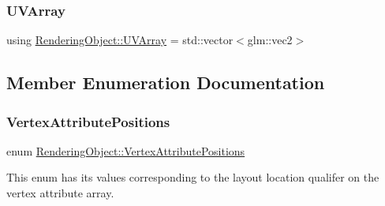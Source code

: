 \hypertarget{class_rendering_object_a504ecd45ebe36dfa5b78c46d64d9904a}{}\label{class_rendering_object_a504ecd45ebe36dfa5b78c46d64d9904a}
\subsubsection{\texorpdfstring{U\+V\+Array}{UVArray}}
{\footnotesize\ttfamily using \hyperlink{class_rendering_object_a504ecd45ebe36dfa5b78c46d64d9904a}{Rendering\+Object\+::\+U\+V\+Array} =  std\+::vector$<$glm\+::vec2$>$}



\subsection{Member Enumeration Documentation}
\hypertarget{class_rendering_object_ab772f569ef63a1db07db29a744b519ee}{}\label{class_rendering_object_ab772f569ef63a1db07db29a744b519ee}
\subsubsection{\texorpdfstring{Vertex\+Attribute\+Positions}{VertexAttributePositions}}
{\footnotesize\ttfamily enum \hyperlink{class_rendering_object_ab772f569ef63a1db07db29a744b519ee}{Rendering\+Object\+::\+Vertex\+Attribute\+Positions}\hspace{0.3cm}{\ttfamily [strong]}}



This enum has its values corresponding to the layout location qualifer on the vertex attribute array.

